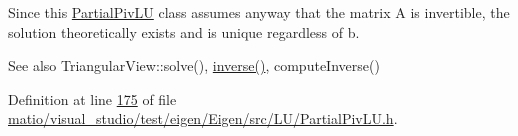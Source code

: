 Since this \hyperlink{group___l_u___module_class_eigen_1_1_partial_piv_l_u}{Partial\+Piv\+LU} class assumes anyway that the matrix A is invertible, the solution theoretically exists and is unique regardless of b.

\begin{DoxySeeAlso}{See also}
Triangular\+View\+::solve(), \hyperlink{group___l_u___module_aef983470f92aba829e861e32e68681b5}{inverse()}, compute\+Inverse() 
\end{DoxySeeAlso}


Definition at line \hyperlink{matio_2visual__studio_2test_2eigen_2_eigen_2src_2_l_u_2_partial_piv_l_u_8h_source_l00175}{175} of file \hyperlink{matio_2visual__studio_2test_2eigen_2_eigen_2src_2_l_u_2_partial_piv_l_u_8h_source}{matio/visual\+\_\+studio/test/eigen/\+Eigen/src/\+L\+U/\+Partial\+Piv\+L\+U.\+h}.

